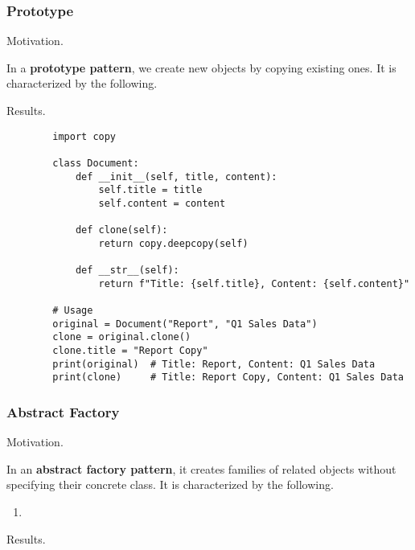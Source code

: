   \subsubsection{Prototype} 

    Motivation. 

    \begin{definition}
      In a \textbf{prototype pattern}, we create new objects by copying existing ones. It is characterized by the following. 
    \end{definition}

    Results. 

    \begin{example}[Document]
      \begin{lstlisting}
        import copy

        class Document:
            def __init__(self, title, content):
                self.title = title
                self.content = content
            
            def clone(self):
                return copy.deepcopy(self)
            
            def __str__(self):
                return f"Title: {self.title}, Content: {self.content}"

        # Usage
        original = Document("Report", "Q1 Sales Data")
        clone = original.clone()
        clone.title = "Report Copy"
        print(original)  # Title: Report, Content: Q1 Sales Data
        print(clone)     # Title: Report Copy, Content: Q1 Sales Data 
      \end{lstlisting}
    \end{example}

  \subsubsection{Abstract Factory}

    Motivation. 

    \begin{definition}
      In an \textbf{abstract factory pattern}, it creates families of related objects without specifying their concrete class. It is characterized by the following. 
      \begin{enumerate}
        \item 
      \end{enumerate}
    \end{definition}

    Results. 

